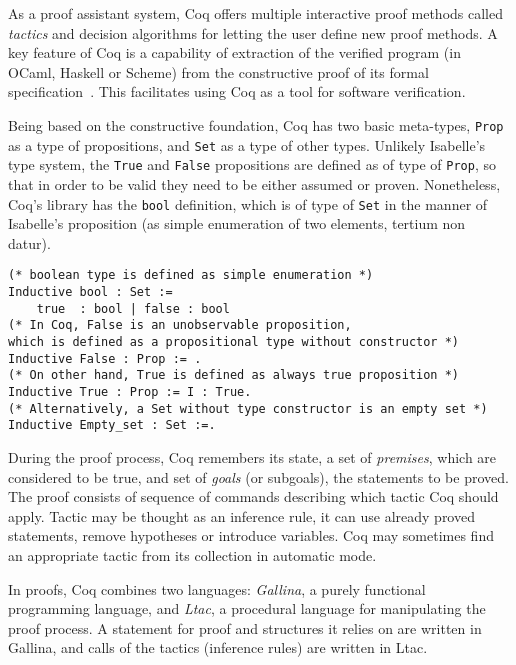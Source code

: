 \documentclass[article]{aaltoseries}
\begin{document}
As a proof assistant system, Coq offers multiple interactive proof methods called \textit{tactics} and decision algorithms for letting the user define new proof methods. A key feature of Coq is a capability of extraction of the verified program (in OCaml, Haskell or Scheme) from the constructive proof of its formal specification~\cite{Letouzey08}. This facilitates using Coq as a tool for software verification.

Being based on the constructive foundation, Coq has two basic meta-types, \texttt{Prop} as a type of propositions, and \texttt{Set} as a type of other types.
Unlikely Isabelle's type system, the \texttt{True} and \texttt{False} propositions are defined as of type of \texttt{Prop}, so that in order to be valid they need to be either assumed or proven. Nonetheless, Coq's library has the \texttt{bool} definition, which is of type of \texttt{Set} in the manner of Isabelle's proposition (as simple enumeration of two elements, tertium non datur).

\begin{lstlisting}[language=coq,
    caption={Basic types definitions in Coq},
    label={ex_typedefs_coq},
    float,floatplacement=H]
(* boolean type is defined as simple enumeration *)
Inductive bool : Set :=
    true  : bool | false : bool
(* In Coq, False is an unobservable proposition,
which is defined as a propositional type without constructor *)
Inductive False : Prop := .
(* On other hand, True is defined as always true proposition *)
Inductive True : Prop := I : True.
(* Alternatively, a Set without type constructor is an empty set *)
Inductive Empty_set : Set :=.
\end{lstlisting}

During the proof process, Coq remembers its state, a set of \textit{premises}, which are considered to be true, and set of \textit{goals} (or subgoals), the statements to be proved. The proof consists of sequence of commands describing which tactic Coq should apply. Tactic may be thought as an inference rule, it can use already proved statements, remove hypotheses or introduce variables. Coq may sometimes find an appropriate tactic from its collection in automatic mode.

In proofs, Coq combines two languages: \textit{Gallina}, a purely functional programming language, and \textit{Ltac}, a procedural language for manipulating the proof process. A statement for proof and structures it relies on are written in Gallina, and calls of the tactics (inference rules) are written in Ltac.
\end{document}
